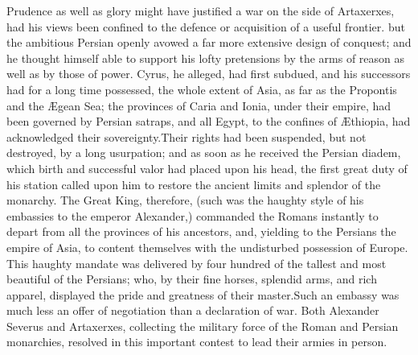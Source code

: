 


Prudence as well as glory might have justified a war on the side
of Artaxerxes, had his views been confined to the defence or
acquisition of a useful frontier. but the ambitious Persian
openly avowed a far more extensive design of conquest; and he
thought himself able to support his lofty pretensions by the arms
of reason as well as by those of power. Cyrus, he alleged, had
first subdued, and his successors had for a long time possessed,
the whole extent of Asia, as far as the Propontis and the Ægean
Sea; the provinces of Caria and Ionia, under their empire, had
been governed by Persian satraps, and all Egypt, to the confines
of Æthiopia, had acknowledged their sovereignty.\footnotemark[47] Their rights
had been suspended, but not destroyed, by a long usurpation; and
as soon as he received the Persian diadem, which birth and
successful valor had placed upon his head, the first great duty
of his station called upon him to restore the ancient limits and
splendor of the monarchy. The Great King, therefore, (such was
the haughty style of his embassies to the emperor Alexander,)
commanded the Romans instantly to depart from all the provinces
of his ancestors, and, yielding to the Persians the empire of
Asia, to content themselves with the undisturbed possession of
Europe. This haughty mandate was delivered by four hundred of the
tallest and most beautiful of the Persians; who, by their fine
horses, splendid arms, and rich apparel, displayed the pride and
greatness of their master.\footnotemark[48] Such an embassy was much less an
offer of negotiation than a declaration of war. Both Alexander
Severus and Artaxerxes, collecting the military force of the
Roman and Persian monarchies, resolved in this important contest
to lead their armies in person.


